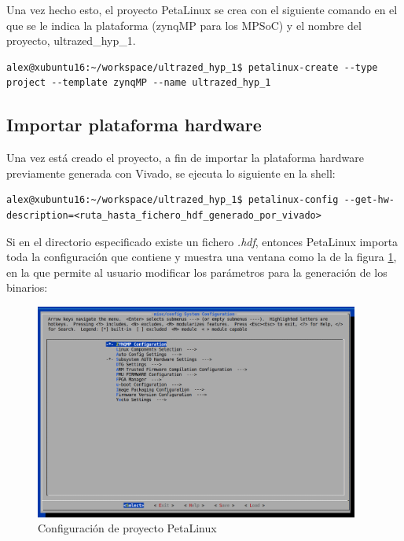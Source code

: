 Una vez hecho esto, el proyecto PetaLinux se crea con el siguiente comando en el que se le indica la plataforma (zynqMP para los MPSoC) y el nombre del proyecto, ultrazed\_hyp\_1.

\begin{lstlisting}[style=CStyle]
alex@xubuntu16:~/workspace/ultrazed_hyp_1$ petalinux-create --type project --template zynqMP --name ultrazed_hyp_1
\end{lstlisting}


\subsection{Importar plataforma hardware}

Una vez está creado el proyecto, a fin de importar la plataforma hardware previamente generada con Vivado, se ejecuta lo siguiente en la shell:

\begin{lstlisting}[style=CStyle]
alex@xubuntu16:~/workspace/ultrazed_hyp_1$ petalinux-config --get-hw-description=<ruta_hasta_fichero_hdf_generado_por_vivado>
\end{lstlisting}

Si en el directorio especificado existe un fichero \textit{.hdf}, entonces PetaLinux importa toda la configuración que contiene y muestra una ventana como la de la figura \ref{fig:petalinux_config_1}, en la que permite al usuario modificar los parámetros para la generación de los binarios:\\

\begin{figure}[!h]
	\centering
	\includegraphics[width=0.95\textwidth]{recursos/petalinux_config_1.png}
	\caption{Configuración de proyecto PetaLinux}
	\label{fig:petalinux_config_1}
\end{figure}


